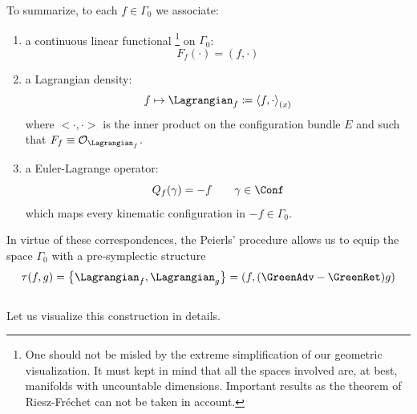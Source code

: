 \documentclass[Main]{subfiles}
\begin{document}
	To summarize, to each $f\in \Gamma_0$ we associate:
	\begin{enumerate}
		\item a continuous linear functional 
				\footnote{ One should not be misled by the extreme simplification of our geometric visualization.
				It must kept in mind that all the spaces involved are, at best, manifolds with uncountable dimensions.
				Important results as the theorem of Riesz-Fréchet can not be taken in account.}
			on $\Gamma_0$:
			\begin{displaymath}
				F_f(\cdot) = (f, \cdot)
			\end{displaymath}

		\item a Lagrangian density:
			\begin{displaymath}
				f \mapsto \Lagrangian_f \coloneqq \left\langle  f , \cdot \right\rangle_{(x)}
			\end{displaymath}
			where $<\cdot,\cdot>$ is the inner product on the configuration bundle $E$ and such that $F_f \equiv \mathcal{O}_{\Lagrangian_f}$.
		\item a Euler-Lagrange operator:
			\begin{displaymath}
				Q_{f}(\gamma) = - f \qquad \gamma \in \Conf
			\end{displaymath}
			which maps every kinematic configuration in $-f \in \Gamma_0$.
	\end{enumerate}
	In virtue of these correspondences, the Peierls' procedure allows us to equip the space $\Gamma_0$ with a pre-symplectic structure
	\begin{displaymath}
		\tau(f,g) =  \left\lbrace \Lagrangian_f , \Lagrangian_g \right\rbrace = \left( f, (\GreenAdv - \GreenRet) g \right)
	\end{displaymath}
	\vspace{2mm}\\
	Let us visualize this construction in details.
	
\end{document}

